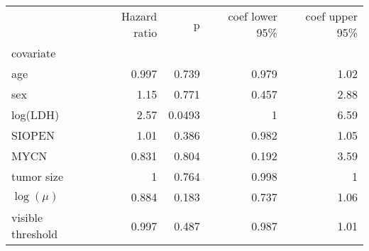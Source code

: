 \begin{tabular}{lrrrr}
\toprule
{} &  Hazard ratio &      p &  coef lower 95\% &  coef upper 95\% \\
covariate         &               &        &                  &                  \\
\midrule
age               &         0.997 &  0.739 &            0.979 &             1.02 \\
sex               &          1.15 &  0.771 &            0.457 &             2.88 \\
log(LDH)          &          2.57 & 0.0493 &                1 &             6.59 \\
SIOPEN            &          1.01 &  0.386 &            0.982 &             1.05 \\
MYCN              &         0.831 &  0.804 &            0.192 &             3.59 \\
tumor size        &             1 &  0.764 &            0.998 &                1 \\
$\log(\mu)$       &         0.884 &  0.183 &            0.737 &             1.06 \\
visible threshold &         0.997 &  0.487 &            0.987 &             1.01 \\
\bottomrule
\end{tabular}
